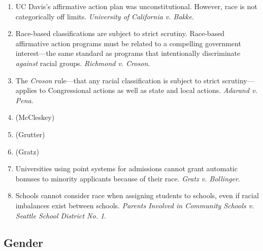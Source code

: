 \begin{enumerate}
\begin{enumerate}
        \item ``Departures from the normal procedural 
        sequence.''\footnote{Casebook p. 1040.}
        \item Substantive departures from normal procedure.
        \item Legislative or administrative history.
    \end{enumerate}
    \item UC Davis's affirmative action plan was unconstitutional. However, 
    race is not categorically off limits. \emph{University of California v. 
    Bakke}. %
    \item Race-based classifications are subject to strict scrutiny. 
    Race-based affirmative action programs must be related to a compelling 
    government interest---the same standard as programs that intentionally 
    discriminate \emph{against} racial groups. \emph{Richmond v. Croson}.
    \item The \emph{Croson} rule---that any racial classification is subject 
    to strict scrutiny---applies to Congressional actions as well as state and 
    local actions. \emph{Adarand v. Pena}.
    \item (McCleskey) %
    \item (Grutter) %
    \item (Gratz) %
    \item Universities using point systems for admissions cannot grant 
    automatic bonuses to minority applicants because of their race. 
    \emph{Gratz v. Bollinger}.
    \item Schools cannot consider race when assigning students to schools, 
    even if racial imbalances exist between schools. \emph{Parents Involved in 
    Community Schools v. Seattle School District No. 1}.
\end{enumerate}

\subsection{Gender}

